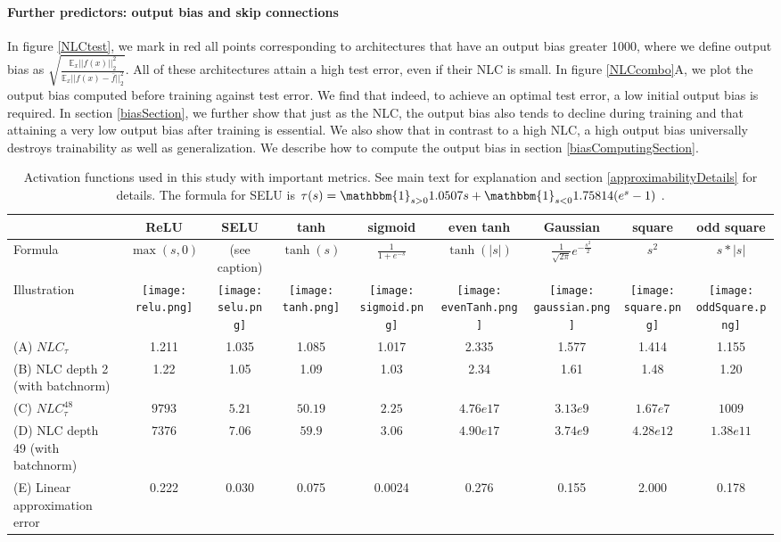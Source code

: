 \documentclass{article} %
\begin{document}

\paragraph{Further predictors: output bias and skip connections} In figure \ref{NLCtest}, we mark in red all points corresponding to architectures that have an output bias greater 1000, where we define output bias as $\sqrt{\frac{\mathbb{E}_x||f(x)||_2^2}{\mathbb{E}_x||f(x)-\bar{f}||_2^2}}$. All of these architectures attain a high test error, even if their NLC is small. In figure \ref{NLCcombo}A, we plot the output bias computed before training against test error. We find that indeed, to achieve an optimal test error, a low initial output bias is required. In section \ref{biasSection}, we further show that just as the NLC, the output bias also tends to decline during training and that attaining a very low output bias after training is essential. We also show that in contrast to a high NLC, a high output bias universally destroys trainability as well as generalization. We describe how to compute the output bias in section \ref{biasComputingSection}.

\begin{table*}
\centering
{
\scriptsize
\begin{tabular}{lcccccccc}
&ReLU&SELU&tanh&sigmoid&even tanh&Gaussian&square&odd square\\ \hline\hline
Formula&$\max(s,0)$&(see caption)&$\tanh(s)$&$\frac{1}{1+e^{-s}}$&$\tanh(|s|)$&$\frac{1}{\sqrt{2\pi}}e^{-\frac{s^2}{2}}$&$s^2$&$s*|s|$\\
Illustration&\texttt{[image: relu.png]}&\texttt{[image: selu.png]}&\texttt{[image: tanh.png]}&\texttt{[image: sigmoid.png]}&\texttt{[image: evenTanh.png]}&\texttt{[image: gaussian.png]}&\texttt{[image: square.png]}&\texttt{[image: oddSquare.png]}\\
(A) $NLC_\tau$&1.211&1.035&1.085&1.017&2.335&1.577&1.414&1.155\\
(B) NLC depth 2 (with batchnorm)&1.22&1.05&1.09&1.03&2.34&1.61&1.48&1.20\\
(C) $NLC_\tau^{48}$&$9793$&$5.21$&$50.19$&$2.25$&$4.76e17$&$3.13e9$&$1.67e7$&$1009$\\
(D) NLC depth 49 (with batchnorm)&$7376$&$7.06$&$59.9$&$3.06$&$4.90e17$&$3.74e9$&$4.28e12$&$1.38e11$\\
(E) Linear approximation error&0.222&0.030&0.075&0.0024&0.276&0.155&2.000&0.178\\
\end{tabular}
}
\caption{Activation functions used in this study with important metrics. See main text for explanation and section \ref{approximabilityDetails} for details. The formula for SELU is $\tau(s) = \mathbbm{1}_{s > 0}1.0507s + \mathbbm{1}_{s < 0}1.75814(e^s-1)$ \citep{selu}.}
\label{nlinfo}
\end{table*}
\end{document}
